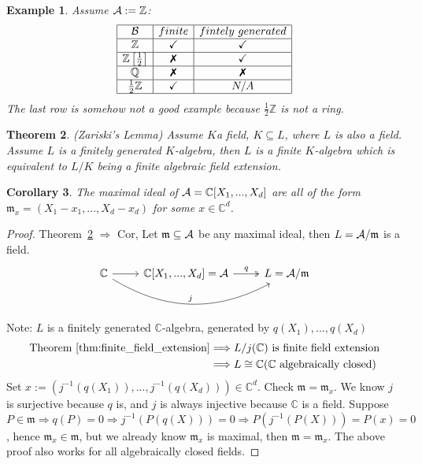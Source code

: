 \documentclass[11pt]{article}
\newtheorem{thm}{Theorem}[section]
\newtheorem{cor}[thm]{Corollary}
\newtheorem{ex}[thm]{Example}
\newcommand{\cplx}{\mathbb C}
\newcommand{\intg}{\mathbb Z}
\newcommand{\scm}{{\mathfrak m}}
\newcommand{\cala}{{\cal A}}
\newcommand{\Lrta}{\Longrightarrow}
\newcommand{\xmark}{\ding{55}}%
\begin{document}
\begin{ex} Assume
$\cala:=\intg$: 
\begin{equation*}
\begin{array}{ |c |c| c| }
\hline
\mathcal{B}  & finite & fintely\ generated\\
\hline
\mathbb{Z}  & \checkmark & \checkmark    \\
\hline
\mathbb{Z}\left[\frac{1}{2}\right] & \text{\xmark} & \checkmark\\
\hline
\mathbb{Q}  & \text{\xmark} & \text{\xmark}\\
\hline
\frac{1}{2}\mathbb{Z}  & \checkmark & N/A\\
\hline
\end{array}
\end{equation*}
The last row is somehow not a good example because $\frac{1}{2}\intg$ is not a ring.
\end{ex}

\begin{thm}\label{thm:finite_field_extension}(Zariski's Lemma)
Assume $K$a field, $K\subseteq  L$, where $ L$ is also a field. Assume $ L$ is a finitely generated $K$-algebra,  then $ L$ is a finite $K$-algebra which is equivalent to $ L/K$ being a finite algebraic field extension.
\end{thm}

\begin{cor}
The maximal ideal of $\cala=\cplx[X_1,...,X_d]$ are all of the form $\scm_x=(X_1-x_1,...,X_d-x_d)$ for some $x\in\cplx^d$.
\end{cor}
\begin{proof}
Theorem~\ref{thm:finite_field_extension} $\Lrta$ Cor, Let $\scm\subseteq \cala$ be any maximal ideal, then $ L=\cala/\scm$ is a field.
 \[
\begin{tikzcd}
\cplx\ar[r]\ar[rr,bend right,"j"]&\cplx[X_1,...,X_d]=\cala\ar[r,two heads,"q"]& L=\cala/\scm  
\end{tikzcd}
\] 
Note: $ L$ is a finitely generated $\cplx$-algebra, generated by $q(X_1),...,q(X_d)$
$$
\begin{aligned}
\text{Theorem~\ref{thm:finite_field_extension}}&\Lrta  L/j(\cplx)\text{ is finite field extension}\\
 & \Lrta
 L\cong \cplx \text{($\cplx$ algebraically closed)}
\end{aligned}
$$
Set $x:=(j^{-1}(q(X_1)),...,j^{-1}(q(X_d)))\in \cplx^d$. Check $\scm=\scm_x$.
We know $j$ is surjective because $q$ is, and $j$ is always injective because $\cplx$ is a field. Suppose $P\in \scm\Lrta q(P)=0\Lrta j^{-1}(P(q(X)))=0\Lrta P(j^{-1}(P(X)))=P(x)=0$, hence $\scm_x\in \scm$, but we already know $\scm_x$ is maximal, then $\scm=\scm_x$. The above proof also works for all algebraically closed fields.
\end{proof}
\end{document}
